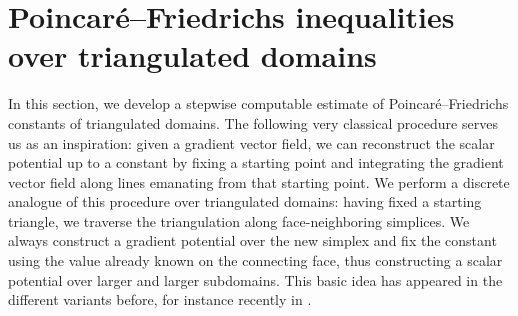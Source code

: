 \documentclass[10pt,letterpaper]{article}
\newcommand\cye[1]{%
\protect\leavevmode
\begingroup
    \color{red!35!yellow}%
    #1%
\endgroup
}
\begin{document}
\section{Poincar\'e--Friedrichs inequalities over triangulated domains}\label{section:gradient}

In this section, we develop a stepwise computable estimate of Poincar\'e--Friedrichs constants of triangulated domains. 
The following very classical procedure serves us as an inspiration: given a gradient vector field, we can reconstruct the scalar potential up to a constant by fixing a starting point and integrating the gradient vector field along lines emanating from that starting point. 
We perform a discrete analogue of this procedure over triangulated domains: 
having fixed a starting triangle, we traverse the triangulation along face-neighboring simplices.
We always construct a gradient potential over the new simplex and fix the constant using the value already known on the connecting face, thus constructing a scalar potential over larger and larger subdomains.
This basic idea has appeared in the different variants before, for instance recently in \cite{Brae_Pill_Sch_p_rob_09, ern2020stable, Chaum_Voh_p_rob_3D_H_curl_24, Voh_loc_glob_H1_24}.



% 
\end{document}
